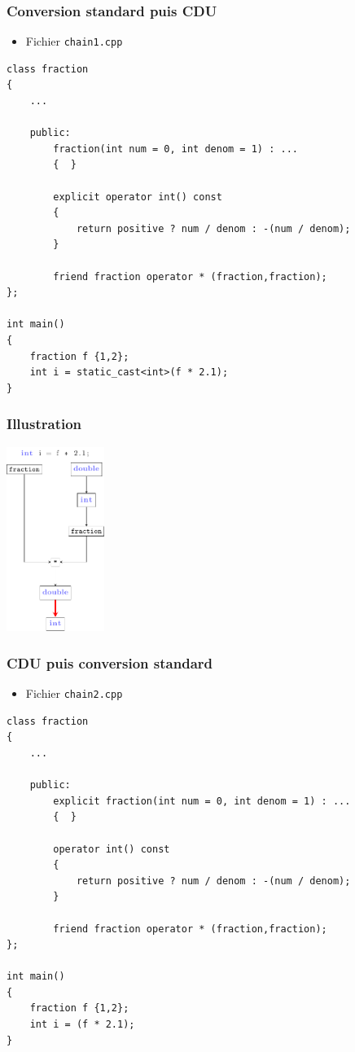 \begin{frame}[containsverbatim]
\frametitle{Conversion standard puis CDU}
\begin{itemize}
\item Fichier \texttt{chain1.cpp}
\end{itemize}
\begin{lstlisting}
class fraction 
{
	...
	
	public:
		fraction(int num = 0, int denom = 1) : ...
		{  }				

		explicit operator int() const
		{
			return positive ? num / denom : -(num / denom);
		}
    
		friend fraction operator * (fraction,fraction); 
};

int main()
{
	fraction f {1,2};  	    
	int i = static_cast<int>(f * 2.1);
}
\end{lstlisting}
\end{frame}

\begin{frame}
\frametitle{Illustration}
\begin{center}
\includegraphics[height=6cm]{pics/conv-4.pdf}
\end{center}
\end{frame}

\begin{frame}[containsverbatim]
\frametitle{CDU puis conversion standard}
\begin{itemize}
\item Fichier \texttt{chain2.cpp}
\end{itemize}
\begin{lstlisting}
class fraction 
{
	...
	
	public:
		explicit fraction(int num = 0, int denom = 1) : ...
		{  }				

		operator int() const
		{
			return positive ? num / denom : -(num / denom);
		}
    
		friend fraction operator * (fraction,fraction); 
};

int main()
{
	fraction f {1,2};  	    
	int i = (f * 2.1);
}
\end{lstlisting}
\end{frame}

